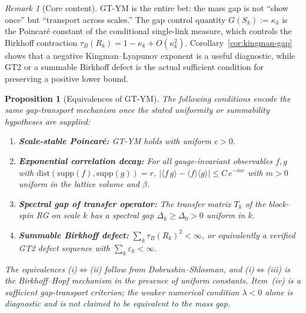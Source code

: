 \documentclass[12pt,a4paper]{article}
\theoremstyle{definition}
\theoremstyle{plain}
\newtheorem{proposition}[definition]{Proposition}
\theoremstyle{remark}
\newtheorem{remark}[definition]{Remark}
\begin{document}
\begin{remark}[Core content]\label{rem:gt-core}
GT-YM is the entire bet: the mass gap is not ``show once'' but ``transport across scales.'' The gap control quantity $G(S_k) := \kappa_k$ is the Poincar\'e constant of the conditional single-link measure, which controls the Birkhoff contraction $\tau_B(R_k) = 1 - \kappa_k + O(\kappa_k^2)$. Corollary~\ref{cor:kingman-gap} shows that a negative Kingman--Lyapunov exponent is a useful diagnostic, while GT2 or a summable Birkhoff defect is the actual sufficient condition for preserving a positive lower bound.
\end{remark}

\begin{proposition}[Equivalences of GT-YM]\label{prop:gt-equivalences}
The following conditions encode the same gap-transport mechanism once the stated uniformity or summability hypotheses are supplied:
\begin{enumerate}
\item[(i)] \textbf{Scale-stable Poincar\'e:} GT-YM holds with uniform $c > 0$.
\item[(ii)] \textbf{Exponential correlation decay:} For all gauge-invariant observables $f, g$ with $\mathrm{dist}(\mathrm{supp}(f), \mathrm{supp}(g)) = r$,
  $|\langle f\, g \rangle - \langle f \rangle \langle g \rangle| \leq C\, e^{-m r}$
  with $m > 0$ uniform in the lattice volume and $\beta$.
\item[(iii)] \textbf{Spectral gap of transfer operator:} The transfer matrix $T_k$ of the block-spin RG on scale $k$ has a spectral gap $\Delta_k \geq \Delta_0 > 0$ uniform in $k$.
\item[(iv)] \textbf{Summable Birkhoff defect:} $\sum_k \tau_B(R_k)^2 < \infty$, or equivalently a verified GT2 defect sequence with $\sum_k\varepsilon_k<\infty$.
\end{enumerate}
The equivalences (i)$\Leftrightarrow$(ii) follow from Dobrushin--Shlosman, and (i)$\Leftrightarrow$(iii) is the Birkhoff--Hopf mechanism in the presence of uniform constants. Item~(iv) is a sufficient gap-transport criterion; the weaker numerical condition $\lambda<0$ alone is diagnostic and is not claimed to be equivalent to the mass gap.
\end{proposition}
\end{document}
